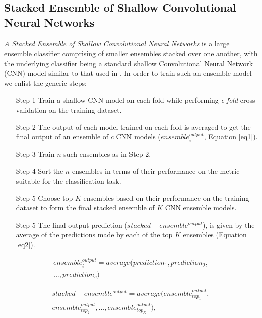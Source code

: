 \documentclass[conference]{IEEEtran}
\begin{document}
\subsection{Stacked Ensemble of Shallow Convolutional Neural Networks \label{stackedCNN}}
\textit{A Stacked Ensemble of Shallow Convolutional Neural Networks} is a large ensemble classifier comprising of smaller ensembles stacked over one another, with the underlying classifier being a standard shallow Convolutional Neural Network (CNN) model similar to that used in \cite{kim2014convolutional}. In order to train such an ensemble model we enlist the generic steps:
\begin{enumerate}
\item[Step 1] Train a shallow CNN model on each fold while performing \textit{c-fold} cross validation on the training dataset.
\item[Step 2] The output of each model trained on each fold is averaged to get the final output of an ensemble of $c$ CNN models ($ensemble_{i}^{output}$, Equation \ref{eq1}).
\item[Step 3] Train $n$ such ensembles as in Step 2. 
\item[Step 4] Sort the $n$ ensembles in terms of their performance on the metric suitable for the classification task. 
\item[Step 5]Choose top $K$ ensembles based on their performance on the training dataset to form the final stacked ensemble of $K$ CNN ensemble models.
\item[Step 5] The final output prediction ($stacked-ensemble^{output}$), is given by the average of the predictions made by each of the top $K$ ensembles (Equation \ref{eq2}).
\end{enumerate}


\begin{equation}
\label{eq1}
\begin{split}
ensemble_{i}^{output} = average(prediction_{1}, prediction_{2}, \\ ..., prediction_{c})
\end{split}
\end{equation}

\begin{equation}
\label{eq2}
\begin{split}
stacked-ensemble^{output} = average(ensemble_{top_{1}}^{output}, \\ ensemble_{top_{2}}^{output},..., ensemble_{top_{K}}^{output}), \\ \\
\end{split}
\end{equation}
\end{document}
